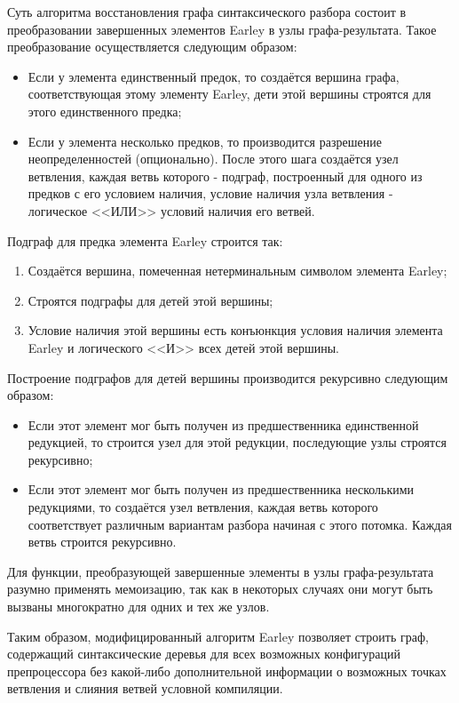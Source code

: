 Суть алгоритма восстановления графа синтаксического разбора состоит в преобразовании завершенных элементов Earley в узлы графа-результата. Такое преобразование осуществляется следующим образом:

\begin{itemize}
\item Если у элемента единственный предок, то создаётся вершина графа, соответствующая этому элементу Earley, дети этой вершины строятся для этого единственного предка;
\item Если у элемента несколько предков, то производится разрешение неопределенностей (опционально). После этого шага создаётся узел ветвления, каждая ветвь которого - подграф, построенный для одного из предков с его условием наличия, условие наличия узла ветвления - логическое <<ИЛИ>> условий наличия его ветвей.
\end{itemize}

Подграф для предка элемента Earley строится так:

\begin{enumerate}
\item Создаётся вершина, помеченная нетерминальным символом элемента Earley;
\item Строятся подграфы для детей этой вершины;
\item Условие наличия этой вершины есть конъюнкция условия наличия элемента Earley и логического <<И>> всех детей этой вершины.
\end{enumerate}

Построение подграфов для детей вершины производится рекурсивно следующим образом:

\begin{itemize}
\item Если этот элемент мог быть получен из предшественника единственной редукцией, то строится узел для этой редукции, последующие узлы строятся рекурсивно;
\item Если этот элемент мог быть получен из предшественника несколькими редукциями, то создаётся узел ветвления, каждая ветвь которого соответствует различным вариантам разбора начиная с этого потомка. Каждая ветвь строится рекурсивно.
\end{itemize}

Для функции, преобразующей завершенные элементы в узлы графа-результата разумно применять мемоизацию, так как в некоторых случаях они могут быть вызваны многократно для одних и тех же узлов.

Таким образом, модифицированный алгоритм Earley позволяет строить граф, содержащий синтаксические деревья для всех возможных конфигураций препроцессора без какой-либо дополнительной информации о возможных точках ветвления и слияния ветвей условной компиляции.

